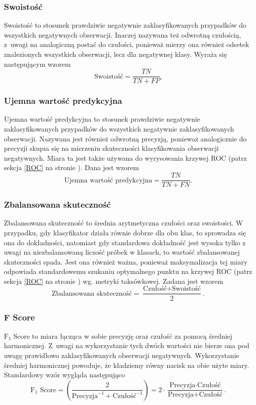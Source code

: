 \documentclass[inzynierska]{pwr_wmat_praca_dyplomowa}
\theoremstyle{plain}
\numberwithin{theorem}{chapter}
\theoremstyle{definition}
\numberwithin{theorem}{chapter}
\begin{document}
\subsubsection{Swoistość}
Swoistość to stosunek prawdziwie negatywnie zaklasyfikowanych przypadków do wszystkich negatywnych obserwacji. Inaczej nazywana też odwrotną czułością, z~uwagi na analogiczną postać do czułości, ponieważ mierzy ona również odsetek znalezionych wszystkich obserwacji, lecz dla negatywnej klasy. Wyraża się następującym wzorem
$$ \text{Swoistość}= \frac{TN}{TN + FP} \text{.}$$

\subsubsection{Ujemna wartość predykcyjna}
Ujemna wartość predykcyjna to stosunek prawdziwie negatywnie zaklasyfikowanych przypadków do wszystkich negatywnie zaklasyfikowanych obserwacji. Nazywana jest również odwrotną precyzją, ponieważ analogicznie do precyzji skupia się na mierzeniu skuteczności klasyfikowania obserwacji negatywnych. Miara ta jest także używana do wyrysowania krzywej ROC (patrz sekcja \ref{ROC} na stronie \pageref{ROC}). Dana jest wzorem
$$ \text{Ujemna wartość predykcyjna}= \frac{TN}{TN + FN} \text{.}$$

\subsubsection{Zbalansowana skuteczność} 
Zbalansowana skuteczność to średnia arytmetyczna czułości oraz swoistości. W przypadku, gdy klasyfikator działa równie dobrze dla obu klas, to sprowadza się ona do dokładności, natomiast gdy standardowa dokładność jest wysoka tylko z uwagi na niezbalansowaną liczość próbek w klasach, to wartość zbalansowanej skuteczności spada. Jest ona również ważna, ponieważ maksymalizacja tej miary odpowiada standardowemu szukaniu optymalnego punktu na krzywej ROC (patrz sekcja \ref{ROC} na stronie \pageref{ROC}) wg. metryki taksówkowej. Zadana jest wzorem
$$ \text{Zbalansowana skuteczność}= \frac{\text{Czułość} + \text{Swoistość}}{2} \text{.}$$

\subsubsection{F Score}
$\text{F}_1$ Score to miara łącząca w sobie precyzję oraz czułość za pomocą średniej harmonicznej. Z~uwagi na wykorzystanie tych dwóch wartości nie bierze ona pod uwagę prawidłowo zaklasyfikowanych obserwacji negatywnych. Wykorzystanie średniej harmonicznej powoduje, że kładziemy równy nacisk na obie użyte miary. Standardowy wzór wygląda następująco
$$ \text{F}_1 \text{ Score} = \left(\frac{2}{\text{Precyzja}^{-1} + \text{Czułość}^{-1}}\right) = 2 \cdot \frac{\text{Precyzja} \cdot \text{Czułość}}{\text{Precyzja} + \text{Czułość}} \text{.}$$
\end{document}
